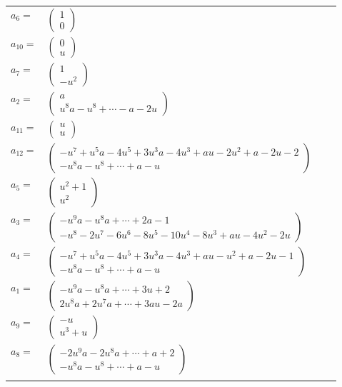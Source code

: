 \documentclass[1p]{elsarticle_modified}
\theoremstyle{definition}
\begin{document}
\begin{tabular}{m{7pt} m{180pt} m{7pt} m{180pt} }
\flushright $a_{6}=$&$\begin{pmatrix}1\\0\end{pmatrix}$ \\
\flushright $a_{10}=$&$\begin{pmatrix}0\\u\end{pmatrix}$ \\
\flushright $a_{7}=$&$\begin{pmatrix}1\\- u^2\end{pmatrix}$ \\
\flushright $a_{2}=$&$\begin{pmatrix}a\\u^8 a- u^8+\cdots- a-2 u\end{pmatrix}$ \\
\flushright $a_{11}=$&$\begin{pmatrix}u\\u\end{pmatrix}$ \\
\flushright $a_{12}=$&$\begin{pmatrix}- u^7+u^5 a-4 u^5+3 u^3 a-4 u^3+a u-2 u^2+a-2 u-2\\- u^8 a- u^8+\cdots+a- u\end{pmatrix}$ \\
\flushright $a_{5}=$&$\begin{pmatrix}u^2+1\\u^2\end{pmatrix}$ \\
\flushright $a_{3}=$&$\begin{pmatrix}- u^9 a- u^8 a+\cdots+2 a-1\\- u^8-2 u^7-6 u^6-8 u^5-10 u^4-8 u^3+a u-4 u^2-2 u\end{pmatrix}$ \\
\flushright $a_{4}=$&$\begin{pmatrix}- u^7+u^5 a-4 u^5+3 u^3 a-4 u^3+a u- u^2+a-2 u-1\\- u^8 a- u^8+\cdots+a- u\end{pmatrix}$ \\
\flushright $a_{1}=$&$\begin{pmatrix}- u^9 a- u^8 a+\cdots+3 u+2\\2 u^8 a+2 u^7 a+\cdots+3 a u-2 a\end{pmatrix}$ \\
\flushright $a_{9}=$&$\begin{pmatrix}- u\\u^3+u\end{pmatrix}$ \\
\flushright $a_{8}=$&$\begin{pmatrix}-2 u^9 a-2 u^8 a+\cdots+a+2\\- u^8 a- u^8+\cdots+a- u\end{pmatrix}$\\&\end{tabular}
\end{document}
